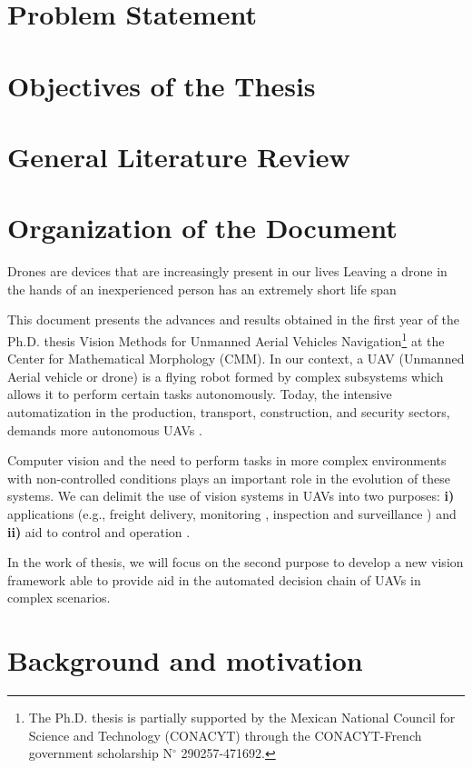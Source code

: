 \section{Problem Statement}
\section{Objectives of the Thesis}
\section{General Literature Review}
\section{Organization of the Document}

Drones are devices that are increasingly present in our lives
Leaving a drone in the hands of an inexperienced person has an extremely short life span

This document presents the advances and results obtained in the first year of the Ph.D. thesis Vision Methods for Unmanned Aerial Vehicles Navigation\footnote{The Ph.D. thesis is partially supported by the Mexican National Council for Science and Technology (CONACYT) through the CONACYT-French government scholarship N$^{\circ}$ 290257-471692.} at the Center for Mathematical Morphology (CMM). In our context, a UAV (Unmanned Aerial vehicle or drone) is a flying robot formed by complex subsystems which allows it to perform certain tasks autonomously. Today, the intensive automatization in the production, transport, construction, and security sectors, demands more autonomous UAVs \cite{ASTechWeb}. 

Computer vision and the need to perform tasks in more complex environments with non-controlled conditions plays an important role in the evolution of these systems. We can delimit the use of vision systems in UAVs into two purposes: \textbf{i)} applications (e.g., freight delivery, monitoring \cite{Gaszczak.Breckon.ea:IRCV:2011}, inspection \cite{Rodriguez.Castiblanco.ea:ICUAS:2014} and surveillance \cite{Saif.Prabuwono.ea:IROS:2013}) and \textbf{ii)} aid to control and operation  \cite{Granlund.Nordberg.ea:ITCE:2000}. 

In the work of thesis, we will focus on the second purpose to develop a new vision framework able to provide aid in the automated decision chain of UAVs in complex scenarios.

\section{Background and motivation}\label{sec:background & motivation}


